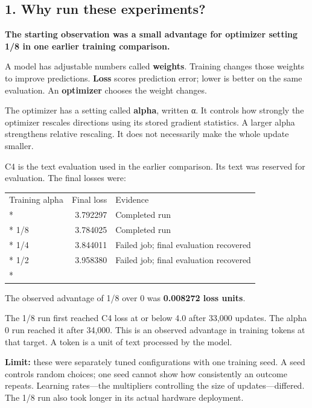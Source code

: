 \documentclass[
  14pt,
  letterpaper,
]{extarticle}
\newcounter{none} %
\begin{document}

\subsection{1. Why run these
experiments?}\label{why-run-these-experiments}

\textbf{The starting observation was a small advantage for optimizer
setting 1/8 in one earlier training comparison.}

A model has adjustable numbers called \textbf{weights}. Training changes
those weights to improve predictions. \textbf{Loss} scores prediction
error; lower is better on the same evaluation. An \textbf{optimizer}
chooses the weight changes.

The optimizer has a setting called \textbf{alpha}, written α. It
controls how strongly the optimizer rescales directions using its stored
gradient statistics. A larger alpha strengthens relative rescaling. It
does not necessarily make the whole update smaller.

C4 is the text evaluation used in the earlier comparison. Its text was
reserved for evaluation. The final losses were:

{\def\LTcaptype{none} %
\begin{longtable}[]{@{}lrl@{}}
\toprule\noalign{}
Training alpha & Final loss & Evidence \\*
\midrule\noalign{}
\endhead
\bottomrule\noalign{}
\endlastfoot
0 & 3.792297 & Completed run \\*
1/8 & 3.784025 & Completed run \\*
1/4 & 3.844011 & Failed job; final evaluation recovered \\*
1/2 & 3.958380 & Failed job; final evaluation recovered \\*
\end{longtable}
}

The observed advantage of 1/8 over 0 was \textbf{0.008272 loss units}.

The 1/8 run first reached C4 loss at or below 4.0 after 33,000 updates.
The alpha 0 run reached it after 34,000. This is an observed advantage
in training tokens at that target. A token is a unit of text processed
by the model.

\textbf{Limit:} these were separately tuned configurations with one
training seed. A seed controls random choices; one seed cannot show how
consistently an outcome repeats. Learning rates---the multipliers
controlling the size of updates---differed. The 1/8 run also took longer
in its actual hardware deployment.
\end{document}
